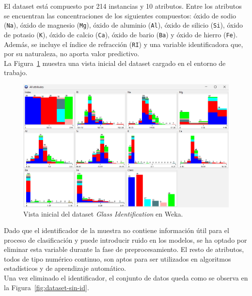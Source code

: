 \documentclass{article}
\begin{document}
El dataset está compuesto por 214 instancias y 10 atributos. Entre los atributos se encuentran las concentraciones de los siguientes compuestos: óxido de sodio (\texttt{Na}), óxido de magnesio (\texttt{Mg}), óxido de aluminio (\texttt{Al}), óxido de silicio (\texttt{Si}), óxido de potasio (\texttt{K}), óxido de calcio (\texttt{Ca}), óxido de bario (\texttt{Ba}) y óxido de hierro (\texttt{Fe}). Además, se incluye el índice de refracción (\texttt{RI}) y una variable identificadora que, por su naturaleza, no aporta valor predictivo.\\

La Figura~\ref{fig:dataset} muestra una vista inicial del dataset cargado en el entorno de trabajo.\\

\begin{figure}[!ht]
    \centering
    \includegraphics[width=1\linewidth]{Imágenes/dataset-glass.png}
    \caption{Vista inicial del dataset \textit{Glass Identification} en Weka.}
    \label{fig:dataset}
\end{figure}

Dado que el identificador de la muestra no contiene información útil para el proceso de clasificación y puede introducir ruido en los modelos, se ha optado por eliminar esta variable durante la fase de preprocesamiento. El resto de atributos, todos de tipo numérico continuo, son aptos para ser utilizados en algoritmos estadísticos y de aprendizaje automático.\\

Una vez eliminado el identificador, el conjunto de datos queda como se observa en la Figura~\ref{fig:dataset-sin-id}.\\
\end{document}

